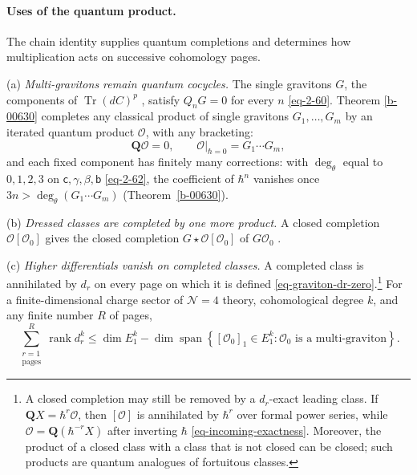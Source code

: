 \documentclass[11pt]{article}
\numberwithin{equation}{section}
\numberwithin{figure}{section}
\numberwithin{table}{section}
\begin{document}
\paragraph{Uses of the quantum product.}\label{uses-of-the-quantum-product}

The chain identity supplies quantum completions and determines how multiplication acts on successive cohomology pages.

(a) \emph{Multi-gravitons remain quantum cocycles.} The single gravitons $G$, the components of $\operatorname{Tr}(dC)^p$ \cite[Section 4]{ChangYin}, satisfy $Q_nG=0$ for every $n$ \eqref{eq-2-60}. Theorem \ref{b-00630} completes any classical product of single gravitons $G_1,\ldots,G_m$ by an iterated quantum product $\mathcal O$, with any bracketing:
\begin{equation}\label{eq-sum-multigraviton}
\mathbf Q\mathcal O=0,\qquad
\left.\mathcal O\right|_{\hbar=0}=G_1\cdots G_m,
\end{equation}
and each fixed component has finitely many corrections: with $\deg_\theta$ equal to $0,1,2,3$ on $\mathsf c,\gamma,\beta,\mathsf b$ \eqref{eq-2-62}, the coefficient of $\hbar^n$ vanishes once $3n>\deg_\theta(G_1\cdots G_m)$ (Theorem~\ref{b-00630}).

(b) \emph{Dressed classes are completed by one more product.} A closed completion $\mathcal O[\mathcal O_0]$ gives the closed completion $G\star\mathcal O[\mathcal O_0]$ of $G\mathcal O_0$ \cite[supplement, Section S8.3]{Repo}.

(c) \emph{Higher differentials vanish on completed classes.} A completed class is annihilated by $d_r$ on every page on which it is defined \eqref{eq-graviton-dr-zero}.\footnote{A closed completion may still be removed by a $d_r$-exact leading class. If $\mathbf QX=\hbar^r\mathcal O$, then $[\mathcal O]$ is annihilated by $\hbar^r$ over formal power series, while $\mathcal O=\mathbf Q(\hbar^{-r}X)$ after inverting $\hbar$ \eqref{eq-incoming-exactness}. Moreover, the product of a closed class with a class that is not closed can be closed; such products are quantum analogues of fortuitous classes.} For a finite-dimensional charge sector of $\mathcal N=4$ theory, cohomological degree $k$, and any finite number $R$ of pages,
\begin{equation}\label{eq-sum-rank}
\sum_{\substack{r=1\\\text{pages}}}^{R}\operatorname{rank}d_r^k
\le\dim E_1^k-
\dim\operatorname{span}\left\{[\mathcal O_0]_1\in E_1^k:\mathcal O_0\text{ is a multi-graviton}\right\}.
\end{equation}
\end{document}
